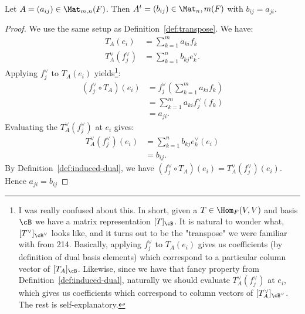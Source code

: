     \begin{lemma}
        Let $A = (a_{ij}) \in \Mat_{m,n}(F)$. Then $A^t = (b_{ij}) \in \Mat_n,m(F)$ with $b_{ij} = a_{ji}$.
    \end{lemma}
        \begin{proof}
            We use the same setup as Definition~\ref{def:transpose}. We have:
                \begin{equation*}
                \begin{split}
                    T_A(e_i)&= \sum_{k=1}^m a_{ki}f_k \\
                    T_A^\vee(f_j^\vee) &= \sum_{k=1}^n b_{kj}e_k^\vee.
                \end{split}
                \end{equation*}
            Applying $f_j^\vee$ to $T_A(e_i)$ yields\footnote{I was really confused about this. In short, given a $T \in \Hom_F{(V,V)}$ and basis $\cB$ we have a matrix representation $[T]_\cB$. It is natural to wonder what, $[T^\vee]_{\cB^\vee}$ looks like, and it turns out to be the "transpose" we were familiar with from 214. Basically, applying $f_j^\vee$ to $T_A(e_i)$ gives us coefficients (by definition of dual basis elements) which correspond to a particular column vector of $[T_A]_\cB$. Likewise, since we have that fancy property from Definition~\ref{def:induced-dual}, naturally we should evaluate $T_A^\vee(f_j^\vee)$ at $e_i$, which gives us coefficients which correspond to column vectors of $[T_A^\vee]_{\cB^\vee}$. The rest is self-explanatory.}:
                \begin{equation*}
                \begin{split}
                    (f_j^\vee \circ T_A)(e_i) &= f_j^\vee \left(\sum_{k=1}^m a_{ki}f_k\right)\\
                    & = \sum_{k=1}^m a_{ki}f_j^\vee(f_k) \\
                    &= a_{ji}.
                \end{split}
                \end{equation*}
            Evaluating the $T_A^\vee(f_j^\vee)$ at $e_i$ gives:
                \begin{equation*}
                \begin{split}
                    T_A^\vee(f_j^\vee)(e_i)
                    & = \sum_{k=1}^n b_{kj}e_k^\vee(e_i) \\
                    & = b_{ij}.
                \end{split}
                \end{equation*}
            By Definition~\ref{def:induced-dual}, we have $(f_j^\vee \circ T_A)(e_i) = T_A^\vee(f_j^\vee)(e_i)$. Hence $a_{ji} = b_{ij}$
        \end{proof}

